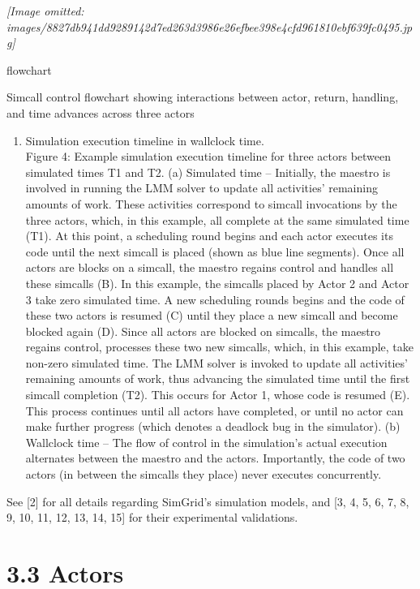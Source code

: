 \documentclass[
]{article}
\providecommand{\tightlist}{%
  \setlength{\itemsep}{0pt}\setlength{\parskip}{0pt}}
\begin{document}
\textit{[Image omitted: images/8827db941dd9289142d7ed263d3986e26efbee398e4cfd961810ebf639fc0495.jpg]}

flowchart

Simcall control flowchart showing interactions between actor, return,
handling, and time advances across three actors

\begin{enumerate}
\def\labelenumi{(\alph{enumi})}
\setcounter{enumi}{1}
\tightlist
\item
  Simulation execution timeline in wallclock time.\\
  Figure 4: Example simulation execution timeline for three actors
  between simulated times T1 and T2. (a) Simulated time -- Initially,
  the maestro is involved in running the LMM solver to update all
  activities' remaining amounts of work. These activities correspond to
  simcall invocations by the three actors, which, in this example, all
  complete at the same simulated time (T1). At this point, a scheduling
  round begins and each actor executes its code until the next simcall
  is placed (shown as blue line segments). Once all actors are blocks on
  a simcall, the maestro regains control and handles all these simcalls
  (B). In this example, the simcalls placed by Actor 2 and Actor 3 take
  zero simulated time. A new scheduling rounds begins and the code of
  these two actors is resumed (C) until they place a new simcall and
  become blocked again (D). Since all actors are blocked on simcalls,
  the maestro regains control, processes these two new simcalls, which,
  in this example, take non-zero simulated time. The LMM solver is
  invoked to update all activities' remaining amounts of work, thus
  advancing the simulated time until the first simcall completion (T2).
  This occurs for Actor 1, whose code is resumed (E). This process
  continues until all actors have completed, or until no actor can make
  further progress (which denotes a deadlock bug in the simulator). (b)
  Wallclock time -- The flow of control in the simulation's actual
  execution alternates between the maestro and the actors. Importantly,
  the code of two actors (in between the simcalls they place) never
  executes concurrently.
\end{enumerate}

See {[}2{]} for all details regarding SimGrid's simulation models, and
{[}3, 4, 5, 6, 7, 8, 9, 10, 11, 12, 13, 14, 15{]} for their experimental
validations.

\section{3.3 Actors}\label{actors}
\end{document}
